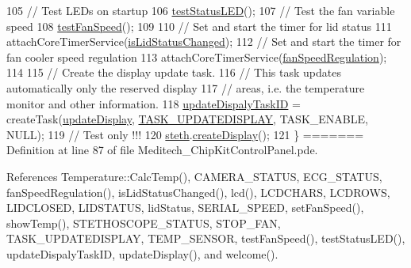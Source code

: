 \begin{DoxyCode}
\begin{DoxyCode}
\begin{DoxyCode}
\begin{DoxyCode}
105   \textcolor{comment}{// Test LEDs on startup}
106   \hyperlink{_meditech___chip_kit_control_panel_8pde_af1a6bbf84a5ea76623bdc49aaf642a28}{testStatusLED}();
107   \textcolor{comment}{// Test the fan variable speed}
108   \hyperlink{_meditech___chip_kit_control_panel_8pde_a697689ffa626676db9a1abb5e6662762}{testFanSpeed}();
109   
110   \textcolor{comment}{// Set and start the timer for lid status}
111   attachCoreTimerService(\hyperlink{_meditech___chip_kit_control_panel_8pde_a9cb6bd9c7a705cdd913780d7adef7bb4}{isLidStatusChanged});
112   \textcolor{comment}{// Set and start the timer for fan cooler speed regulation}
113   attachCoreTimerService(\hyperlink{_meditech___chip_kit_control_panel_8pde_a16768141866f1d78608528f2867aeab4}{fanSpeedRegulation});
114   
115   \textcolor{comment}{// Create the display update task.}
116   \textcolor{comment}{// This task updates automatically only the reserved display}
117   \textcolor{comment}{// areas, i.e. the temperature monitor and other information.}
118   \hyperlink{_meditech___chip_kit_control_panel_8pde_a527a89c41abb1d8660b53f5e727e655c}{updateDispalyTaskID} = createTask(\hyperlink{_meditech___chip_kit_control_panel_8pde_a5a7516a22f178c51ec37c6c8167aaf70}{updateDisplay}, 
      \hyperlink{_globals_8h_ab24200fce9fdcbdd9b76bd40f21cb50e}{TASK\_UPDATEDISPLAY}, TASK\_ENABLE, NULL);
119   \textcolor{comment}{// Test only !!!}
120   \hyperlink{_meditech___chip_kit_control_panel_8pde_ac2215fe61cf27d0fc83fa54cf1db73fc}{steth}.\hyperlink{class_l_c_d_stethoscope_a2641dd844d4070d6f498ba20c04cdfac}{createDisplay}();
121 \}
=======
Definition at line 87 of file Meditech\-\_\-\-Chip\-Kit\-Control\-Panel.\-pde.



References Temperature\-::\-Calc\-Temp(), C\-A\-M\-E\-R\-A\-\_\-\-S\-T\-A\-T\-U\-S, E\-C\-G\-\_\-\-S\-T\-A\-T\-U\-S, fan\-Speed\-Regulation(), is\-Lid\-Status\-Changed(), lcd(), L\-C\-D\-C\-H\-A\-R\-S, L\-C\-D\-R\-O\-W\-S, L\-I\-D\-C\-L\-O\-S\-E\-D, L\-I\-D\-S\-T\-A\-T\-U\-S, lid\-Status, S\-E\-R\-I\-A\-L\-\_\-\-S\-P\-E\-E\-D, set\-Fan\-Speed(), show\-Temp(), S\-T\-E\-T\-H\-O\-S\-C\-O\-P\-E\-\_\-\-S\-T\-A\-T\-U\-S, S\-T\-O\-P\-\_\-\-F\-A\-N, T\-A\-S\-K\-\_\-\-U\-P\-D\-A\-T\-E\-D\-I\-S\-P\-L\-A\-Y, T\-E\-M\-P\-\_\-\-S\-E\-N\-S\-O\-R, test\-Fan\-Speed(), test\-Status\-L\-E\-D(), update\-Dispaly\-Task\-I\-D, update\-Display(), and welcome().



\end{DoxyCode}
\end{DoxyCode}
\end{DoxyCode}
\end{DoxyCode}
